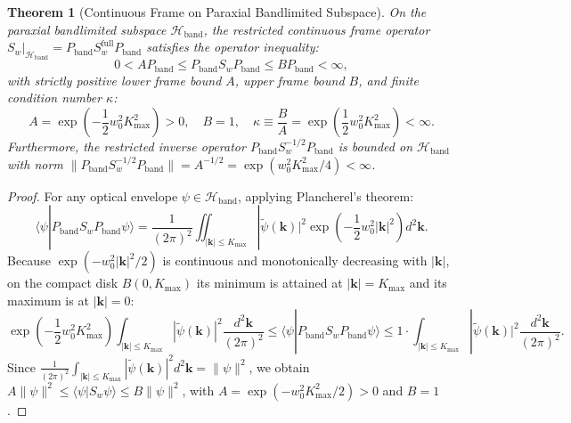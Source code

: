 \documentclass{optica-article}
\newtheorem{theorem}{Theorem}
\begin{document}
\begin{theorem}[Continuous Frame on Paraxial Bandlimited Subspace]
\label{thm:frame_bounds}
On the paraxial bandlimited subspace $\mathcal{H}_{\text{band}}$, the restricted continuous frame operator $S_w|_{\mathcal{H}_{\text{band}}} = P_{\text{band}} S_w^{\text{full}} P_{\text{band}}$ satisfies the operator inequality:
\begin{equation}
\boxed{0 < A P_{\text{band}} \le P_{\text{band}} S_w P_{\text{band}} \le B P_{\text{band}} < \infty,}
\label{eq:thm3_frame_bounds}
\end{equation}
with strictly positive lower frame bound $A$, upper frame bound $B$, and finite condition number $\kappa$:
\begin{equation}
A = \exp\left( - \frac{1}{2} w_0^2 K_{\max}^2 \right) > 0, \quad B = 1, \quad \kappa \equiv \frac{B}{A} = \exp\left( \frac{1}{2} w_0^2 K_{\max}^2 \right) < \infty.
\label{eq:thm3_condition_number}
\end{equation}
Furthermore, the restricted inverse operator $P_{\text{band}} S_w^{-1/2} P_{\text{band}}$ is bounded on $\mathcal{H}_{\text{band}}$ with norm $\|P_{\text{band}} S_w^{-1/2} P_{\text{band}}\| = A^{-1/2} = \exp(w_0^2 K_{\max}^2 / 4) < \infty$.
\end{theorem}

\begin{proof}
For any optical envelope $\psi \in \mathcal{H}_{\text{band}}$, applying Plancherel's theorem:
\begin{equation}
\langle \psi | P_{\text{band}} S_w P_{\text{band}} \psi \rangle = \frac{1}{(2\pi)^2} \iint_{|\mathbf{k}| \le K_{\max}} |\widetilde{\psi}(\mathbf{k})|^2 \exp\left( - \frac{1}{2} w_0^2 |\mathbf{k}|^2 \right) d^2\mathbf{k}.
\label{eq:plancherel_frame}
\end{equation}
Because $\exp(-w_0^2 |\mathbf{k}|^2 / 2)$ is continuous and monotonically decreasing with $|\mathbf{k}|$, on the compact disk $B(0, K_{\max})$ its minimum is attained at $|\mathbf{k}| = K_{\max}$ and its maximum is at $|\mathbf{k}| = 0$:
\begin{equation}
\exp\left( - \frac{1}{2} w_0^2 K_{\max}^2 \right) \int_{|\mathbf{k}| \le K_{\max}} |\widetilde{\psi}(\mathbf{k})|^2 \frac{d^2\mathbf{k}}{(2\pi)^2} \le \langle \psi | P_{\text{band}} S_w P_{\text{band}} \psi \rangle \le 1 \cdot \int_{|\mathbf{k}| \le K_{\max}} |\widetilde{\psi}(\mathbf{k})|^2 \frac{d^2\mathbf{k}}{(2\pi)^2}.
\label{eq:frame_bounds_sandwiched}
\end{equation}
Since $\frac{1}{(2\pi)^2} \int_{|\mathbf{k}| \le K_{\max}} |\widetilde{\psi}(\mathbf{k})|^2 d^2\mathbf{k} = \|\psi\|^2$, we obtain $A \|\psi\|^2 \le \langle \psi | S_w \psi \rangle \le B \|\psi\|^2$, with $A = \exp(-w_0^2 K_{\max}^2 / 2) > 0$ and $B = 1$.
\end{proof}
\end{document}
